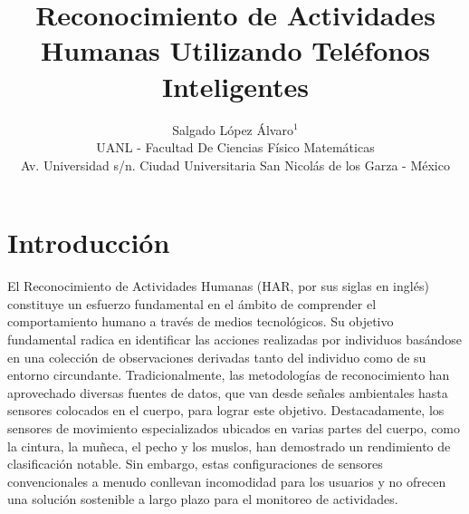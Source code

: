 \documentclass{esannV2}
\begin{document}
\title{Reconocimiento de Actividades Humanas Utilizando Teléfonos Inteligentes}

\author{Salgado López Álvaro$^1$
%
%
\vspace{.3cm}\\
%
UANL - Facultad De Ciencias Físico Matemáticas \\
Av. Universidad s/n. Ciudad Universitaria San Nicolás de los Garza - México
}
%
\maketitle


\section{Introducción}

El Reconocimiento de Actividades Humanas (HAR, por sus siglas en inglés) constituye un esfuerzo fundamental en el ámbito de comprender el comportamiento humano a través de medios tecnológicos. Su objetivo fundamental radica en identificar las acciones realizadas por individuos basándose en una colección de observaciones derivadas tanto del individuo como de su entorno circundante. Tradicionalmente, las metodologías de reconocimiento han aprovechado diversas fuentes de datos, que van desde señales ambientales hasta sensores colocados en el cuerpo, para lograr este objetivo. Destacadamente, los sensores de movimiento especializados ubicados en varias partes del cuerpo, como la cintura, la muñeca, el pecho y los muslos, han demostrado un rendimiento de clasificación notable. Sin embargo, estas configuraciones de sensores convencionales a menudo conllevan incomodidad para los usuarios y no ofrecen una solución sostenible a largo plazo para el monitoreo de actividades.
\end{document}
